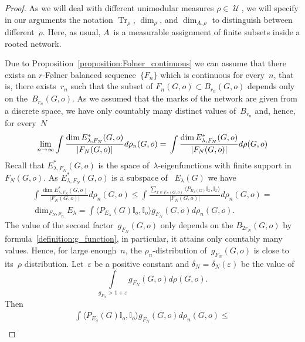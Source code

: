 \documentclass[english]{article}
\theoremstyle{definition}
\DeclareMathOperator{\Tr}{Tr} %
\DeclareMathOperator{\U}{{\mathcal{U}}}
\newcommand*\eps{\varepsilon}
\begin{document}
\begin{proof}
    As we will deal with different unimodular measures $\rho \in \U$, we will specify in our arguments the notation $\Tr_\rho$, $\dim_\rho$, and $\dim_{A,\rho}$ to distinguish between different~$\rho$. Here, as usual, $A$~is a measurable assignment of finite subsets inside a rooted network.  
    
    Due to Proposition~\ref{proposition:Folner_continuous} we can assume that there exists an $r$-F\o lner balanced sequence~$\{F_n\}$ which is continuous for every~$n$, that is, there exists~$r_n$ such that the subset of $F_n(G,o)\subset B_{r_n}(G,o)$ depends only on the~$B_{r_n}(G,o)$. 
    As we assumed that the marks of the network are given from a discrete space, we have only countably many distinct values of~$B_{r_n}$ and, hence, for every~$N$
    \begin{equation}\label{eq_appr0}
        \lim_{n\to \infty}\int\frac{ \dim E^*_{\lambda, F_N}(G,o)}{|F_N(G,o)|} d \rho_n(G,o) = \\
        \int\frac{ \dim E^*_{\lambda, F_N}(G,o)}{|F_N(G,o)|} d \rho(G,o)
    \end{equation}
    Recall that $E^*_{\lambda, F_N}(G,o)$ is the space of~$\lambda$-eigenfunctions with finite support in~$F_N(G, o)$. As $E^*_{\lambda, F_N}(G,o)$ is a subspace of ~$E_\lambda(G)$ we have 
    \begin{multline}\label{eq948675}
        \int\frac{ \dim E^*_{\lambda, F_N}(G,o)}{|F_N(G,o)|} d \rho_n(G,o) \le 
        \int\frac{ \sum_{x \in F_N(G,o)} \langle P_{E_\lambda(G)}\mathbb I_x, \mathbb I_x \rangle}{|F_N(G,o)|} d \rho_n(G,o) 
        = \\ \dim_{F_N, \rho_n} E_\lambda = 
        \int \langle P_{E_\lambda}(G)\mathbb I_o, \mathbb I_o \rangle g_{F_N}(G,o)  d\rho_n(G,o).
    \end{multline}
    The value of the second factor~$g_{F_N}(G,o)$ only depends on the $B_{2r_N}(G,o)$ by formula~\eqref{definition:g_function}, in particular, it attains only countably many values. Hence, for large enough~$n$, the $\rho_n$-distribution of~$g_{F_N}(G,o)$ is close to its~$\rho$ distribution. Let~$\eps$ be a positive constant and $\delta_N = \delta_N(\eps)$ be the value of
    $$
     \int\limits_{g_{F_N} > 1 + \eps} g_{F_N}(G,o) d \rho(G,o).
    $$
    Then
    \begin{multline}\label{eq_467687924}
        \int \langle P_{E_\lambda}(G)\mathbb I_o, \mathbb I_o \rangle g_{F_N}(G,o)  d\rho_n(G,o) \le \\

\end{multline}
\end{proof}
\end{document}
